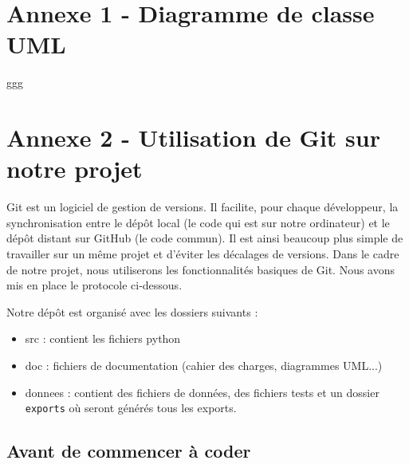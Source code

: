 \documentclass[11pt]{article}
\begin{document}





\newpage
{}
\appendix  %
\section*{Annexe 1 - Diagramme de classe UML}


ggg



\newpage

\section*{Annexe 2 - Utilisation de Git sur notre projet}

Git est un logiciel de gestion de versions. Il facilite, pour chaque développeur, la synchronisation entre le dépôt local (le code qui est sur notre ordinateur) et le dépôt distant sur GitHub (le code commun). Il est ainsi beaucoup plus simple de travailler sur un même projet et d'éviter les décalages de versions. Dans le cadre de notre projet, nous utiliserons les fonctionnalités basiques de Git. Nous avons mis en place le protocole ci-dessous.

\bigbreak

Notre dépôt est organisé avec les dossiers suivants :
\begin{itemize}
    \item src : contient les fichiers python
    \item doc : fichiers de documentation (cahier des charges, diagrammes UML...)
    \item donnees : contient des fichiers de données, des fichiers tests et un dossier \texttt{exports} où seront générés tous les exports. 
\end{itemize}


\subsection*{Avant de commencer à coder}
\end{document}
